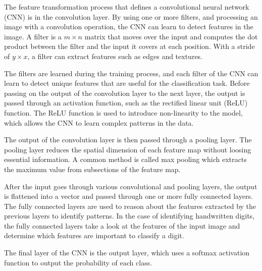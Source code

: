 The feature transformation process that defines a convolutional neural network (CNN) is in the convolution layer. By using one or more filters, and processing an image with a convolution operation, the CNN can learn to detect features in the image. A filter is a $m \times n$ matrix that moves over the input and computes the dot product between the filter and the input it covers at each position. With a stride of $y \times x$, a filter can extract features such as edges and textures. 
\par
The filters are learned during the training process, and each filter of the CNN can learn to detect unique features that are useful for the classification task. Before passing on the output of the convolution layer to the next layer, the output is passed through an activation function, such as the rectified linear unit (ReLU) function. The ReLU function is used to introduce non-linearity to the model, which allows the CNN to learn complex patterns in the data.
\par
The output of the convolution layer is then passed through a pooling layer. The pooling layer reduces the spatial dimension of each feature map without loosing essential information. A common method is called max pooling which extracts the maximum value from subsections of the feature map.
\par
After the input goes through various convolutional and pooling layers, the output is flattened into a vector and passed through one or more fully connected layers. The fully connected layers are used to reason about the features extracted by the previous layers to identify patterns. In the case of identifying handwritten digits, the fully connected layers take a look at the features of the input image and determine which features are important to classify a digit. 
\par
The final layer of the CNN is the output layer, which uses a softmax activation function to output the probability of each class. 
